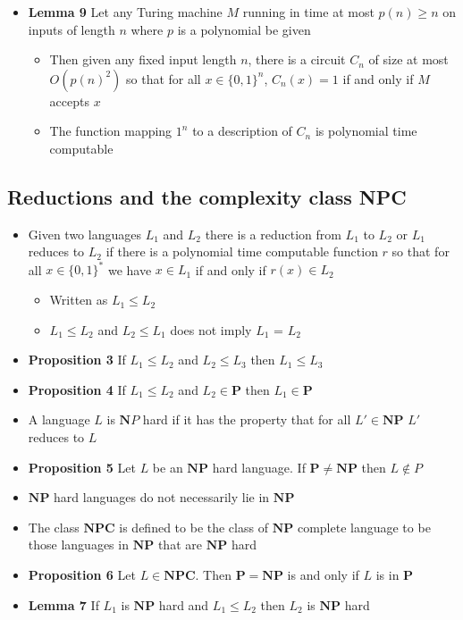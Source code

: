 \documentclass[11pt]{article}
\begin{document}
\begin{itemize}
\item \textbf{Lemma 9} Let any Turing machine \(M\) running in time at most \(p(n) \geq n\) on inputs of length \(n\) where \(p\) is a polynomial be given
\begin{itemize}
\item Then given any fixed input length \(n\), there is a circuit \(C_n\) of size at most \(O(p(n)^2)\) so that for all \(x \in \{0,1\}^n\), \(C_n(x) = 1\) if and only if \(M\) accepts \(x\)
\item The function mapping \(1^n\) to a description of \(C_n\) is polynomial time computable
\end{itemize}
\end{itemize}

\subsection{Reductions and the complexity class NPC}
\label{sec:org88f65d5}
\begin{itemize}
\item Given two languages \(L_1\) and \(L_2\) there is a reduction from \(L_1\) to \(L_2\) or \(L_1\) reduces to \(L_2\) if there is a polynomial time computable function \(r\) so that for all \(x \in \{0,1\}^*\) we have \(x \in L_1\) if and only if \(r(x ) \in L_2\)
\begin{itemize}
\item Written as \(L_1 \leq L_2\)
\item \(L_1 \leq L_2\) and \(L_2 \leq L_1\) does not imply \(L_1\) = \(L_2\)
\end{itemize}
\item \textbf{Proposition 3} If \(L_1 \leq L_2\) and \(L_2 \leq L_3\) then \(L_1 \leq L_3\)
\item \textbf{Proposition 4} If \(L_1 \leq L_2\) and \(L_2 \in \mathbf P\) then \(L_1 \in \mathbf P\)

\item A language \(L\) is \(\mathbf NP\) hard if it has the property that for all \(L' \in \mathbf{NP}\) \(L'\) reduces to \(L\)
\item \textbf{Proposition 5} Let \(L\) be an \(\mathbf{NP}\) hard language. If \(\mathbf{P} \ne \mathbf{NP}\) then \(L \notin P\)
\item \(\mathbf{NP}\) hard languages do not necessarily lie in \(\mathbf{NP}\)

\item The class \(\mathbf{NPC}\) is defined to be the class of \(\mathbf{NP}\) complete language to be those languages in \(\mathbf{NP}\) that are \(\mathbf{NP}\) hard
\item \textbf{Proposition 6} Let \(L \in \mathbf{NPC}\). Then \(\mathbf P = \mathbf{NP}\) is and only if \(L\) is in \(\mathbf P\)

\item \textbf{Lemma 7} If \(L_1\) is \(\mathbf{NP}\) hard and \(L_1 \leq L_2\) then \(L_2\) is \(\mathbf{NP}\) hard
\end{itemize}
\end{document}
